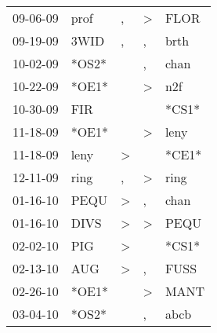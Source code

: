 \begin{supertabular}{p{0.07\textwidth}p{0.06\textwidth}p{0.02\textwidth}p{0.02\textwidth}p{0.06\textwidth}}
          09-06-09\textsuperscript{} &           prof\textsuperscript{} &                , &     \textgreater &           FLOR\textsuperscript{} \\
          09-19-09\textsuperscript{} &           3WID\textsuperscript{} &                , &                , &           brth\textsuperscript{} \\
          10-02-09\textsuperscript{} &                            *OS2* &                  &                , &           chan\textsuperscript{} \\
          10-22-09\textsuperscript{} &                            *OE1* &                  &     \textgreater &            n2f\textsuperscript{} \\
          10-30-09\textsuperscript{} &            FIR\textsuperscript{} &                  &                  &                            *CS1* \\
          11-18-09\textsuperscript{} &                            *OE1* &                  &     \textgreater &           leny\textsuperscript{} \\
          11-18-09\textsuperscript{} &           leny\textsuperscript{} &     \textgreater &                  &                            *CE1* \\
          12-11-09\textsuperscript{} &           ring\textsuperscript{} &                , &     \textgreater &           ring\textsuperscript{} \\
          01-16-10\textsuperscript{} &           PEQU\textsuperscript{} &     \textgreater &                , &           chan\textsuperscript{} \\
          01-16-10\textsuperscript{} &           DIVS\textsuperscript{} &     \textgreater &     \textgreater &           PEQU\textsuperscript{} \\
          02-02-10\textsuperscript{} &            PIG\textsuperscript{} &     \textgreater &                  &                            *CS1* \\
          02-13-10\textsuperscript{} &            AUG\textsuperscript{} &     \textgreater &                , &           FUSS\textsuperscript{} \\
          02-26-10\textsuperscript{} &                            *OE1* &                  &     \textgreater &           MANT\textsuperscript{} \\
          03-04-10\textsuperscript{} &                            *OS2* &                  &                , &           abcb\textsuperscript{} \\

\end{supertabular}
